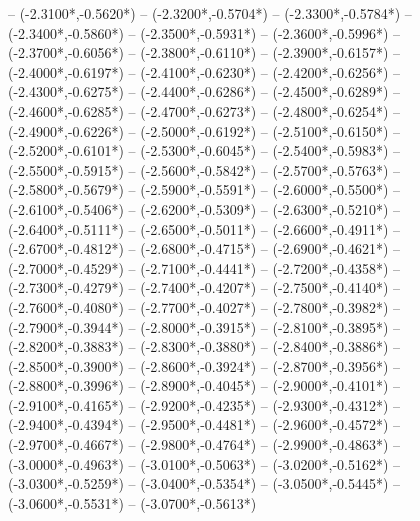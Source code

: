 {	-- ({-2.3100*\dx},{-0.5620*\dy})
	-- ({-2.3200*\dx},{-0.5704*\dy})
	-- ({-2.3300*\dx},{-0.5784*\dy})
	-- ({-2.3400*\dx},{-0.5860*\dy})
	-- ({-2.3500*\dx},{-0.5931*\dy})
	-- ({-2.3600*\dx},{-0.5996*\dy})
	-- ({-2.3700*\dx},{-0.6056*\dy})
	-- ({-2.3800*\dx},{-0.6110*\dy})
	-- ({-2.3900*\dx},{-0.6157*\dy})
	-- ({-2.4000*\dx},{-0.6197*\dy})
	-- ({-2.4100*\dx},{-0.6230*\dy})
	-- ({-2.4200*\dx},{-0.6256*\dy})
	-- ({-2.4300*\dx},{-0.6275*\dy})
	-- ({-2.4400*\dx},{-0.6286*\dy})
	-- ({-2.4500*\dx},{-0.6289*\dy})
	-- ({-2.4600*\dx},{-0.6285*\dy})
	-- ({-2.4700*\dx},{-0.6273*\dy})
	-- ({-2.4800*\dx},{-0.6254*\dy})
	-- ({-2.4900*\dx},{-0.6226*\dy})
	-- ({-2.5000*\dx},{-0.6192*\dy})
	-- ({-2.5100*\dx},{-0.6150*\dy})
	-- ({-2.5200*\dx},{-0.6101*\dy})
	-- ({-2.5300*\dx},{-0.6045*\dy})
	-- ({-2.5400*\dx},{-0.5983*\dy})
	-- ({-2.5500*\dx},{-0.5915*\dy})
	-- ({-2.5600*\dx},{-0.5842*\dy})
	-- ({-2.5700*\dx},{-0.5763*\dy})
	-- ({-2.5800*\dx},{-0.5679*\dy})
	-- ({-2.5900*\dx},{-0.5591*\dy})
	-- ({-2.6000*\dx},{-0.5500*\dy})
	-- ({-2.6100*\dx},{-0.5406*\dy})
	-- ({-2.6200*\dx},{-0.5309*\dy})
	-- ({-2.6300*\dx},{-0.5210*\dy})
	-- ({-2.6400*\dx},{-0.5111*\dy})
	-- ({-2.6500*\dx},{-0.5011*\dy})
	-- ({-2.6600*\dx},{-0.4911*\dy})
	-- ({-2.6700*\dx},{-0.4812*\dy})
	-- ({-2.6800*\dx},{-0.4715*\dy})
	-- ({-2.6900*\dx},{-0.4621*\dy})
	-- ({-2.7000*\dx},{-0.4529*\dy})
	-- ({-2.7100*\dx},{-0.4441*\dy})
	-- ({-2.7200*\dx},{-0.4358*\dy})
	-- ({-2.7300*\dx},{-0.4279*\dy})
	-- ({-2.7400*\dx},{-0.4207*\dy})
	-- ({-2.7500*\dx},{-0.4140*\dy})
	-- ({-2.7600*\dx},{-0.4080*\dy})
	-- ({-2.7700*\dx},{-0.4027*\dy})
	-- ({-2.7800*\dx},{-0.3982*\dy})
	-- ({-2.7900*\dx},{-0.3944*\dy})
	-- ({-2.8000*\dx},{-0.3915*\dy})
	-- ({-2.8100*\dx},{-0.3895*\dy})
	-- ({-2.8200*\dx},{-0.3883*\dy})
	-- ({-2.8300*\dx},{-0.3880*\dy})
	-- ({-2.8400*\dx},{-0.3886*\dy})
	-- ({-2.8500*\dx},{-0.3900*\dy})
	-- ({-2.8600*\dx},{-0.3924*\dy})
	-- ({-2.8700*\dx},{-0.3956*\dy})
	-- ({-2.8800*\dx},{-0.3996*\dy})
	-- ({-2.8900*\dx},{-0.4045*\dy})
	-- ({-2.9000*\dx},{-0.4101*\dy})
	-- ({-2.9100*\dx},{-0.4165*\dy})
	-- ({-2.9200*\dx},{-0.4235*\dy})
	-- ({-2.9300*\dx},{-0.4312*\dy})
	-- ({-2.9400*\dx},{-0.4394*\dy})
	-- ({-2.9500*\dx},{-0.4481*\dy})
	-- ({-2.9600*\dx},{-0.4572*\dy})
	-- ({-2.9700*\dx},{-0.4667*\dy})
	-- ({-2.9800*\dx},{-0.4764*\dy})
	-- ({-2.9900*\dx},{-0.4863*\dy})
	-- ({-3.0000*\dx},{-0.4963*\dy})
	-- ({-3.0100*\dx},{-0.5063*\dy})
	-- ({-3.0200*\dx},{-0.5162*\dy})
	-- ({-3.0300*\dx},{-0.5259*\dy})
	-- ({-3.0400*\dx},{-0.5354*\dy})
	-- ({-3.0500*\dx},{-0.5445*\dy})
	-- ({-3.0600*\dx},{-0.5531*\dy})
	-- ({-3.0700*\dx},{-0.5613*\dy})
}
